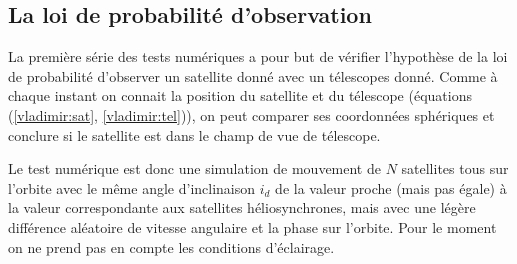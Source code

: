 

 


 

\subsection{La loi de probabilit\'e d'observation}
La premi\`ere s\'erie des tests num\'eriques a pour but de v\'erifier
l'hypoth\`ese de la loi de probabilit\'e d'observer un satellite 
donn\'e avec un t\'elescopes donn\'e. 
Comme \`a chaque instant on connait la position du satellite et du t\'elescope
(équations (\ref{vladimir:sat}, \ref{vladimir:tel})), on peut comparer ses coordonn\'ees sph\'eriques 
et conclure si le satellite est dans le champ de vue de t\'elescope.


Le test num\'erique est donc une simulation de mouvement de $N$ satellites
tous sur l'orbite avec le m\^eme angle d'inclinaison $i_d$ de la valeur proche (mais pas \'egale) 
\`a la valeur correspondante aux satellites h\'eliosynchrones, mais avec une l\'eg\`ere diff\'erence 
al\'eatoire de vitesse angulaire et la phase sur l'orbite. Pour le moment on 
ne prend pas en compte les conditions d'\'eclairage. 

